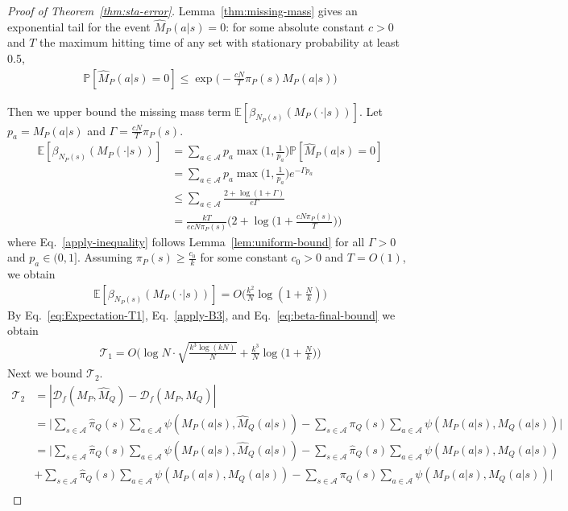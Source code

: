 \documentclass{article}
\theoremstyle{plain}
\theoremstyle{definition}
\theoremstyle{remark}
\begin{document}
\begin{proof}[Proof of Theorem~\ref{thm:sta-error}]
Lemma~\ref{thm:missing-mass} gives an exponential tail for the event $\hat{M}_P(a|s) = 0$: for some absolute constant $c>0$ and $T$ the maximum hitting time of any set with stationary probability at least 0.5,
\begin{align}
    \mathbb P[\hat M_P(a|s)=0]\leq \exp\Big(-\frac{cN}{T}\pi_P(s)M_P(a|s)\Big)
\end{align}





Then we upper bound the missing mass term $\mathbb E[\beta_{N_P(s)}(M_P(\cdot|s))]$. Let $p_a = M_P(a|s)$ and $\Gamma = \frac{cN}{T}\pi_P(s)$.
\begin{align}
    \mathbb E[\beta_{N_P(s)}(M_P(\cdot|s))] &= \sum_{a\in \mathcal{A}} p_a \max \Big(1,\frac{1}{p_a}\Big) \mathbb P[\hat M_P(a|s)=0] \\
    &= \sum_{a\in \mathcal{A}} p_a \max \Big(1,\frac{1}{p_a}\Big) e^{-\Gamma p_a} \\
    & \leq  \sum_{a\in \mathcal{A}} \frac{2+\log(1+\Gamma)}{e \Gamma} \label{apply-inequality}\\
    & = \frac{kT}{ecN \pi_P(s)} \Big(2+\log \Big(1+\frac{cN\pi_P(s)}{T}\Big)\Big)
\end{align}
where Eq.~\ref{apply-inequality} follows Lemma~\ref{lem:uniform-bound} for all $\Gamma>0$ and $p_a\in (0,1]$. Assuming $\pi_P(s)\geq \frac{c_0}{k}$ for some constant $c_0>0$ and $T=O(1)$, we obtain
\begin{align}
    \mathbb E[\beta_{N_P(s)}(M_P(\cdot|s))]  = O\Big(\frac{k^2}{N}\log (1+\frac{N}{k}) \Big) \label{eq:beta-final-bound}
\end{align}
By Eq.~\ref{eq:Expectation-T1}, Eq.~\ref{apply-B3}, and Eq.~\ref{eq:beta-final-bound} we obtain
\begin{align}
    \mathcal{T}_1 = O \Big(\log N\cdot \sqrt{\frac{k^3\log(kN)}{N}}+\frac{k^3}{N}\log\big(1+\frac{N}{k}\big)\Big)
\end{align}
Next we bound $ \mathcal{T}_2$. 
\begin{align}
    \mathcal{T}_2 &= |\mathcal{D}_f( M_P, \hat M_Q)-\mathcal{D}_f(M_P,M_Q)|  \\
    & = \bigg| \sum_{s\in \mathcal{A}} \hat \pi_Q(s) \sum_{a \in \mathcal{A}} \psi (M_P(a|s),\hat M_Q(a|s)) - \sum_{s\in \mathcal{A}} \pi_Q(s) \sum_{a \in \mathcal{A}} \psi ( M_P(a|s),  M_Q(a|s)) \bigg| \\
    & =  \bigg| \sum_{s\in \mathcal{A}} \hat \pi_Q(s) \sum_{a \in \mathcal{A}} \psi (M_P(a|s),\hat M_Q(a|s)) - \sum_{s\in \mathcal{A}} \hat \pi_Q(s) \sum_{a \in \mathcal{A}} \psi (M_P(a|s),M_Q(a|s))\nonumber\\&+ \sum_{s\in \mathcal{A}} \hat \pi_Q(s) \sum_{a \in \mathcal{A}} \psi (M_P(a|s),M_Q(a|s))- \sum_{s\in \mathcal{A}} \pi_Q(s) \sum_{a \in \mathcal{A}} \psi ( M_P(a|s),  M_Q(a|s)) \bigg| \\

\end{align}
\end{proof}
\end{document}
